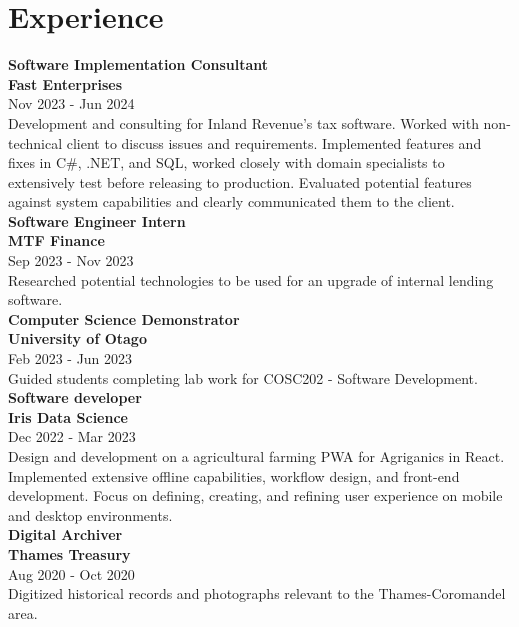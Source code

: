 \documentclass[lighthipster]{simplehipstercv}
\begin{document}
    \begin{minipage}[t]{1\textwidth}
    \section*{Experience}
    
    \textbf{Software Implementation Consultant}\\
    \textbf{Fast Enterprises }\\
    Nov 2023 - Jun 2024 \\
    Development and consulting for Inland Revenue's tax software. 
        Worked with non-technical client to discuss issues and requirements. 
        Implemented features and fixes in C\#, .NET, and SQL, worked closely with domain specialists to extensively test before releasing to production.
        Evaluated potential features against system capabilities and clearly communicated them to the client. \\
    
    \textbf{Software Engineer Intern}\\
    \textbf{MTF Finance }\\
    Sep 2023 - Nov 2023 \\
    Researched potential technologies to be used for an upgrade of internal lending software.\\
    
    \textbf{Computer Science Demonstrator}\\
    \textbf{University of Otago }\\
    Feb 2023 - Jun 2023 \\
    Guided students completing lab work for COSC202 - Software Development.\\
    
    \textbf{Software developer}\\
    \textbf{Iris Data Science }\\
    Dec 2022 - Mar 2023 \\
    Design and development on a agricultural farming PWA for Agriganics in React. 
        Implemented extensive offline capabilities, workflow design, and front-end development. 
        Focus on defining, creating, and refining user experience on mobile and desktop environments.\\
    
    \textbf{Digital Archiver}\\
    \textbf{Thames Treasury }\\
    Aug 2020 - Oct 2020 \\
    Digitized historical records and photographs relevant to the Thames-Coromandel area.\\
    

\end{minipage}
\end{document}
